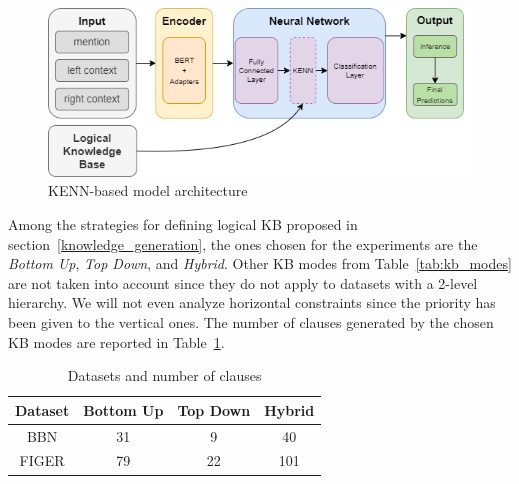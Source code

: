 \begin{figure}[H]
    \centering
    \includegraphics[width=.8\linewidth]{figures/et_kenn_architecture.png}
    \caption{KENN-based model architecture}
    \label{fig:et_kenn_architecture}
\end{figure}

Among the strategies for defining logical KB proposed in section~\ref{knowledge_generation}, the ones chosen for the experiments are the \textit{Bottom Up}, \textit{Top Down}, and \textit{Hybrid}. Other KB modes from Table~\ref{tab:kb_modes} are not taken into account since they do not apply to datasets with a 2-level hierarchy. We will not even analyze horizontal constraints since the priority has been given to the vertical ones. The number of clauses generated by the chosen KB modes are reported in Table~\ref{tab:dataset_clauses}.

\begin{table}
\centering
\caption{Datasets and number of clauses}
\label{tab:dataset_clauses}
\begin{tabular}{|c|ccc|}
\hline
\textbf{Dataset} & \multicolumn{1}{c|}{\textbf{Bottom Up}} & \multicolumn{1}{c|}{\textbf{Top Down}} & \textbf{Hybrid} \\ \hline
BBN              & 31                                      & 9                                      & 40              \\ \hline
FIGER            & 79                                      & 22                                     & 101             \\ \hline
\end{tabular}
\end{table}

